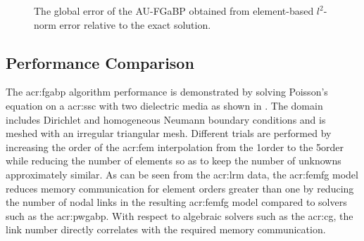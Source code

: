 \begin{figure}[t]
	\caption[The global error performance of the AU-FGaBP.]{The global error of the AU-FGaBP obtained from element-based $l^2$-norm error relative to the exact solution.}
	\label{fig:HelmRes}
\end{figure}


\subsection{Performance Comparison}

The \gls{acr:fgabp} algorithm performance is demonstrated by solving Poisson's equation on a \gls{acr:ssc} with two dielectric media as shown in .
The domain includes Dirichlet and homogeneous Neumann boundary conditions and is meshed with an irregular triangular mesh.
Different trials are performed by increasing the order of the \gls{acr:fem} interpolation from the 1\ssst order to the 5\ssth order while reducing the number of elements so as to keep the number of unknowns approximately similar.
As can be seen from the \gls{acr:lrm} data, the \gls{acr:femfg} model reduces memory communication for element orders greater than one by reducing the number of nodal links in the resulting \gls{acr:femfg} model compared to solvers such as the \gls{acr:pwgabp}.
With respect to algebraic solvers such as the \gls{acr:cg}, the link number directly correlates with the required memory communication.

